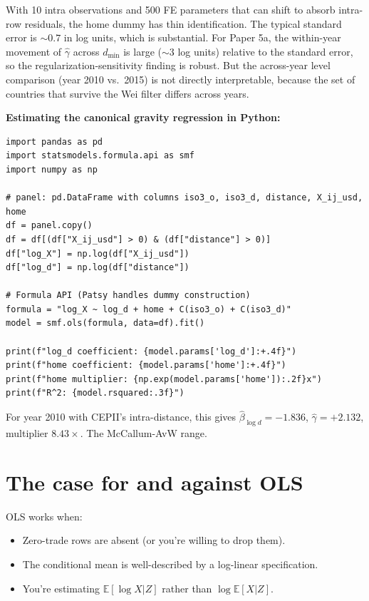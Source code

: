 \documentclass[11pt,letterpaper,oneside]{book}
\theoremstyle{definition}
\theoremstyle{remark}
\newcommand{\E}{\mathbb{E}}
\begin{document}
With 10 intra observations and 500 FE parameters that can shift to
absorb intra-row residuals, the home dummy has thin identification.
The typical standard error is $\sim 0.7$ in log units, which is
substantial. For Paper 5a, the within-year movement of $\hat{\gamma}$
across $d_{\min}$ is large ($\sim 3$ log units) relative to the
standard error, so the regularization-sensitivity finding is robust.
But the across-year level comparison (year 2010 vs.\ 2015) is not
directly interpretable, because the set of countries that survive
the Wei filter differs across years.

\begin{worked}
\textbf{Estimating the canonical gravity regression in Python:}

\begin{lstlisting}
import pandas as pd
import statsmodels.formula.api as smf
import numpy as np

# panel: pd.DataFrame with columns iso3_o, iso3_d, distance, X_ij_usd, home
df = panel.copy()
df = df[(df["X_ij_usd"] > 0) & (df["distance"] > 0)]
df["log_X"] = np.log(df["X_ij_usd"])
df["log_d"] = np.log(df["distance"])

# Formula API (Patsy handles dummy construction)
formula = "log_X ~ log_d + home + C(iso3_o) + C(iso3_d)"
model = smf.ols(formula, data=df).fit()

print(f"log_d coefficient: {model.params['log_d']:+.4f}")
print(f"home coefficient: {model.params['home']:+.4f}")
print(f"home multiplier: {np.exp(model.params['home']):.2f}x")
print(f"R^2: {model.rsquared:.3f}")
\end{lstlisting}

For year 2010 with CEPII's intra-distance, this gives
$\hat{\beta}_{\log d} = -1.836$, $\hat{\gamma} = +2.132$, multiplier
$8.43\times$. The McCallum-AvW range.
\end{worked}

\section{The case for and against OLS}

OLS works when:
\begin{itemize}
  \item Zero-trade rows are absent (or you're willing to drop them).
  \item The conditional mean is well-described by a log-linear specification.
  \item You're estimating $\E[\log X | Z]$ rather than $\log \E[X | Z]$.
\end{itemize}
\end{document}
